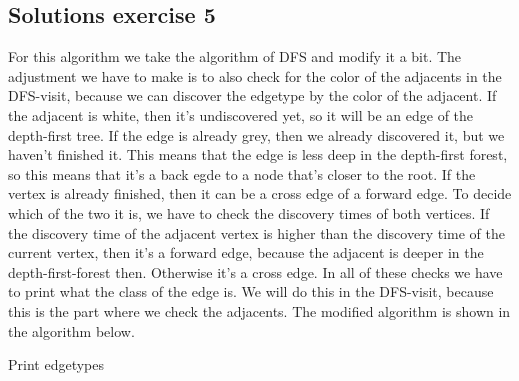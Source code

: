 \documentclass{article}
\begin{document}
\subsection*{Solutions exercise 5}
For this algorithm we take the algorithm of DFS and modify it a bit. The adjustment we have to make is to also check for the color of the adjacents in the DFS-visit, because we can discover the edgetype by the color of the adjacent.
\newline
If the adjacent is white, then it's undiscovered yet, so it will be an edge of the depth-first tree.
\newline
If the edge is already grey, then we already discovered it, but we haven't finished it. This means that the edge is less deep in the depth-first forest, so this means that it's a back egde to a node that's closer to the root.
\newline
If the vertex is already finished, then it can be a cross edge of a forward edge. To decide which of the two it is, we have to check the discovery times of both vertices. If the discovery time of the adjacent vertex is higher than the discovery time of the current vertex, then it's a forward edge, because the adjacent is deeper in the depth-first-forest then. Otherwise it's a cross edge.
\newline
In all of these checks we have to print what the class of the edge is. We will do this in the DFS-visit, because this is the part where we check the adjacents. The modified algorithm is shown in the algorithm below.

\begin{algorithm}[ht!]
  \DontPrintSemicolon



    \caption{Print edgetypes}
\end{algorithm}
\end{document}
